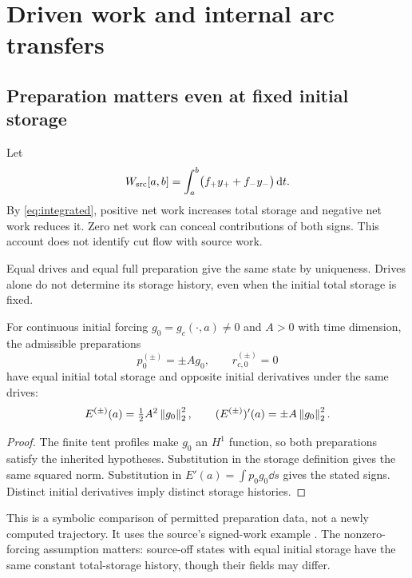 \section{Driven work and internal arc transfers}\label{sec:driven}
\subsection{Preparation matters even at fixed initial storage}
Let
\begin{equation}\label{eq:Wsrc}
 W_{\rm src}[a,b]=\int_a^b\bigl(f_+y_++f_-y_-\bigr)\,\mathrm d t.
\end{equation}
By \eqref{eq:integrated}, positive net work increases total storage and negative net work reduces it. Zero net work can conceal contributions of both signs. This account does not identify cut flow with source work.

Equal drives and equal full preparation give the same state by uniqueness. Drives alone do not determine its storage history, even when the initial total storage is fixed.
\begin{proposition}\label{prop:preparation}
For continuous initial forcing $g_0=g_c(\cdot,a)\ne0$ and $A>0$ with time dimension, the admissible preparations
\begin{equation}\label{eq:preparations}
 p_0^{(\pm)}=\pm A g_0,\qquad r_{c,0}^{(\pm)}=0
\end{equation}
have equal initial total storage and opposite initial derivatives under the same drives:
\begin{equation}\label{eq:preparationwork}
 E^{(\pm)}(a)=\tfrac12A^2\left\|g_0\right\|_2^2,\qquad
 (E^{(\pm)})'(a)=\pm A\left\|g_0\right\|_2^2.
\end{equation}
\end{proposition}
\begin{proof}
The finite tent profiles make $g_0$ an $H^1$ function, so both preparations satisfy the inherited hypotheses. Substitution in the storage definition gives the same squared norm. Substitution in $E'(a)=\int p_0g_0\dd s$ gives the stated signs. Distinct initial derivatives imply distinct storage histories.
\end{proof}
This is a symbolic comparison of permitted preparation data, not a newly computed trajectory. It uses the source's signed-work example \cite[work theorem and preparation example]{pairedII}. The nonzero-forcing assumption matters: source-off states with equal initial storage have the same constant total-storage history, though their fields may differ.

